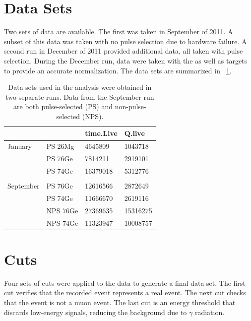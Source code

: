 \section{Data Sets}
Two sets of \reaction data are available.  The first was taken in September of 2011.  A subset of this data was taken with no pulse selection due to hardware failure.  A second run in December of 2011 provided additional data, all taken with pulse selection.  During the December run, data were taken with the \GeTargets as well as  targets to provide an accurate normalization.  The data sets are summarized in {\tab}~\ref{tab:dataSets}.
\begin{table}[htp]
\centering
\begin{tabular}{llll}
            & & time.Live & Q.live \\
\hline
January     & PS 26Mg & 4645809 & 1043718 \\
	    & PS 76Ge & 7814211 & 2919101 \\
	    & PS 74Ge & 16379018 & 5312776 \\ \\

September   & PS 76Ge & 12616566 & 2872649 \\
	    & PS 74Ge & 11666670 & 2619116 \\
	    & NPS 76Ge & 27369635 & 15316275 \\
	    & NPS 74Ge & 11323947 & 10008757 \\
\end{tabular}
\caption{Data sets used in the analysis were obtained in two separate runs.  Data from the September run are both pulse-selected (PS) and non-pulse-selected (NPS).}
\label{tab:dataSets}
\end{table}

\section{Cuts}
\label{sec:cuts}
Four sets of cuts were applied to the data to generate a final data set.  The first cut verifies that the recorded event represents a real event.  The next cut checks that the event is not a muon event.  The last cut is an energy threshold that discards low-energy signals, reducing the background due to $\gamma$ radiation.

